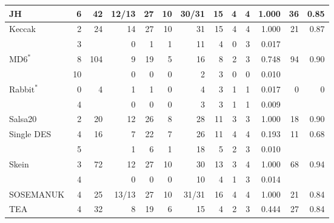 \documentclass[aspectratio=169]{beamer}
\newcommand{\rd}{\cellcolor{red!40}}
\newcommand{\cone}{\cellcolor{lvl1!90}}
\newcommand{\ctwo}{\cellcolor{lvl2}}
\newcommand{\cfour}{\cellcolor{lvl4}}
\begin{document}
\begin{frame}
\begin{nomar}
{\begin{tabular}{@{}lrrrrrrrrrrrr@{}}
JH                               &  6 &  42 & 12/13 \rd & 27 \rd & 10 \rd   & 30/31 \rd & 15 \rd & 4 \rd & 4 \rd & 1.000 \rd & 36 & 0.85 \cone   \\ \midrule
Keccak                           &  2 &  24 & 14    \rd & 27 \rd & 10 \rd   & 31    \rd & 15 \rd & 4 \rd & 4 \rd & 1.000 \rd & 21 & 0.87 \cone   \\
                                 &  3 &     &  0        &  1     &  1       & 11    \rd &  4 \rd & 0     & 3 \rd & 0.017     &    &              \\ \midrule
MD$\text{6}^{\ast}$              &  8 & 104 &  9    \rd & 19 \rd &  5 \rd   & 16    \rd &  8 \rd & 2 \rd & 3 \rd & 0.748 \rd & 94 & 0.90 \cone   \\
                                 & 10 &     &  0        &  0     &  0       &  2        &  3 \rd & 0     & 0     & 0.010     &    &              \\ \midrule
Rabbi$\text{t}^{\ast}$           &  0 &   4 &  1        &  1     &  0       &  4    \rd &  3 \rd & 1     & 1     & 0.017     &  0 & 0    \cfour  \\
                                 &  4 &     &  0        &  0     &  0       &  3        &  3 \rd & 1     & 1     & 0.009     &    &              \\ \midrule
Salsa20                          &  2 &  20 & 12    \rd & 26 \rd &  8 \rd   & 28    \rd & 11 \rd & 3 \rd & 3 \rd & 1.000 \rd & 18 & 0.90 \cone   \\ \midrule
Single DES                       &  4 &  16 &  7    \rd & 22 \rd &  7 \rd   & 26    \rd & 11 \rd & 4 \rd & 4 \rd & 0.193 \rd & 11 & 0.68 \ctwo   \\
                                 &  5 &     &  1        &  6 \rd &  1       & 18    \rd &  5 \rd & 2 \rd & 3 \rd & 0.010     &    &              \\ \midrule
Skein                            &  3 &  72 & 12    \rd & 27 \rd & 10 \rd   & 30    \rd & 13 \rd & 3 \rd & 4 \rd & 1.000 \rd & 68 & 0.94 \cone   \\
                                 &  4 &     &  0        &  0     &  0       & 10    \rd &  4 \rd & 1     & 3 \rd & 0.014     &    &              \\ \midrule
SOSEMANUK                        &  4 &  25 & 13/13 \rd & 27 \rd & 10 \rd   & 31/31 \rd & 16 \rd & 4 \rd & 4 \rd & 1.000 \rd & 21 & 0.84 \cone   \\ \midrule
TEA                              &  4 &  32 &  8    \rd & 19 \rd &  6 \rd   & 15    \rd &  4 \rd & 2 \rd & 3 \rd & 0.444 \rd & 27 & 0.84 \cone   \\

\end{tabular}}
\end{nomar}
\end{frame}
\end{document}
